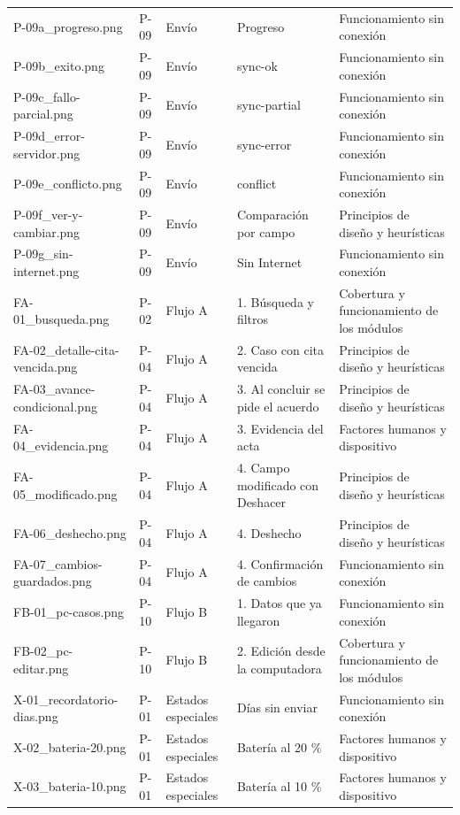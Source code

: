 \begin{longtable}{@{}p{4.2cm}p{1.1cm}p{2.2cm}p{3.2cm}p{3.4cm}@{}}
P-09a\_progreso.png & P-09 & Envío & Progreso & Funcionamiento sin conexión \\
P-09b\_exito.png & P-09 & Envío & sync-ok & Funcionamiento sin conexión \\
P-09c\_fallo-parcial.png & P-09 & Envío & sync-partial & Funcionamiento sin conexión \\
P-09d\_error-servidor.png & P-09 & Envío & sync-error & Funcionamiento sin conexión \\
P-09e\_conflicto.png & P-09 & Envío & conflict & Funcionamiento sin conexión \\
P-09f\_ver-y-cambiar.png & P-09 & Envío & Comparación por campo & Principios de diseño y heurísticas \\
P-09g\_sin-internet.png & P-09 & Envío & Sin Internet & Funcionamiento sin conexión \\
FA-01\_busqueda.png & P-02 & Flujo A & 1. Búsqueda y filtros & Cobertura y funcionamiento de los módulos \\
FA-02\_detalle-cita-vencida.png & P-04 & Flujo A & 2. Caso con cita vencida & Principios de diseño y heurísticas \\
FA-03\_avance-condicional.png & P-04 & Flujo A & 3. Al concluir se pide el acuerdo & Principios de diseño y heurísticas \\
FA-04\_evidencia.png & P-04 & Flujo A & 3. Evidencia del acta & Factores humanos y dispositivo \\
FA-05\_modificado.png & P-04 & Flujo A & 4. Campo modificado con Deshacer & Principios de diseño y heurísticas \\
FA-06\_deshecho.png & P-04 & Flujo A & 4. Deshecho & Principios de diseño y heurísticas \\
FA-07\_cambios-guardados.png & P-04 & Flujo A & 4. Confirmación de cambios & Funcionamiento sin conexión \\
FB-01\_pc-casos.png & P-10 & Flujo B & 1. Datos que ya llegaron & Funcionamiento sin conexión \\
FB-02\_pc-editar.png & P-10 & Flujo B & 2. Edición desde la computadora & Cobertura y funcionamiento de los módulos \\
X-01\_recordatorio-dias.png & P-01 & Estados especiales & Días sin enviar & Funcionamiento sin conexión \\
X-02\_bateria-20.png & P-01 & Estados especiales & Batería al 20 \% & Factores humanos y dispositivo \\
X-03\_bateria-10.png & P-01 & Estados especiales & Batería al 10 \% & Factores humanos y dispositivo \\

\end{longtable}
